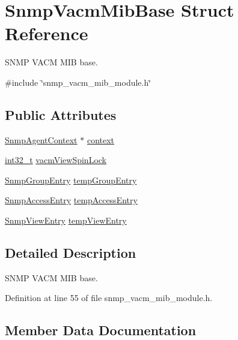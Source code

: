 \hypertarget{structSnmpVacmMibBase}{}\section{Snmp\+Vacm\+Mib\+Base Struct Reference}
\label{structSnmpVacmMibBase}


S\+N\+MP V\+A\+CM M\+IB base.  




{\ttfamily \#include \char`\"{}snmp\+\_\+vacm\+\_\+mib\+\_\+module.\+h\char`\"{}}

\subsection*{Public Attributes}
\begin{DoxyCompactItemize}
\item 
\hyperlink{snmp__agent_8h_a4c68afef83114acf80065b64191bfdac}{Snmp\+Agent\+Context} $\ast$ \hyperlink{structSnmpVacmMibBase_a39d2eb3c1c876fbc0882a7bfc4c6d765}{context}
\item 
\hyperlink{stdint_8h_ab1967d8591af1a4e48c37fd2b0f184d0}{int32\+\_\+t} \hyperlink{structSnmpVacmMibBase_abafbd601b9a27b6e57d7ef267e9c4874}{vacm\+View\+Spin\+Lock}
\item 
\hyperlink{structSnmpGroupEntry}{Snmp\+Group\+Entry} \hyperlink{structSnmpVacmMibBase_a3e98c29d9d2edab22f9ed6b066146136}{temp\+Group\+Entry}
\item 
\hyperlink{structSnmpAccessEntry}{Snmp\+Access\+Entry} \hyperlink{structSnmpVacmMibBase_aeda8d1f2a245f0b882d38bd60b6c5a80}{temp\+Access\+Entry}
\item 
\hyperlink{structSnmpViewEntry}{Snmp\+View\+Entry} \hyperlink{structSnmpVacmMibBase_a9311a7e596e0c31f2b7b50106d8b4321}{temp\+View\+Entry}
\end{DoxyCompactItemize}


\subsection{Detailed Description}
S\+N\+MP V\+A\+CM M\+IB base. 

Definition at line 55 of file snmp\+\_\+vacm\+\_\+mib\+\_\+module.\+h.



\subsection{Member Data Documentation}
\mbox{\label{structSnmpVacmMibBase_a39d2eb3c1c876fbc0882a7bfc4c6d765}} 
